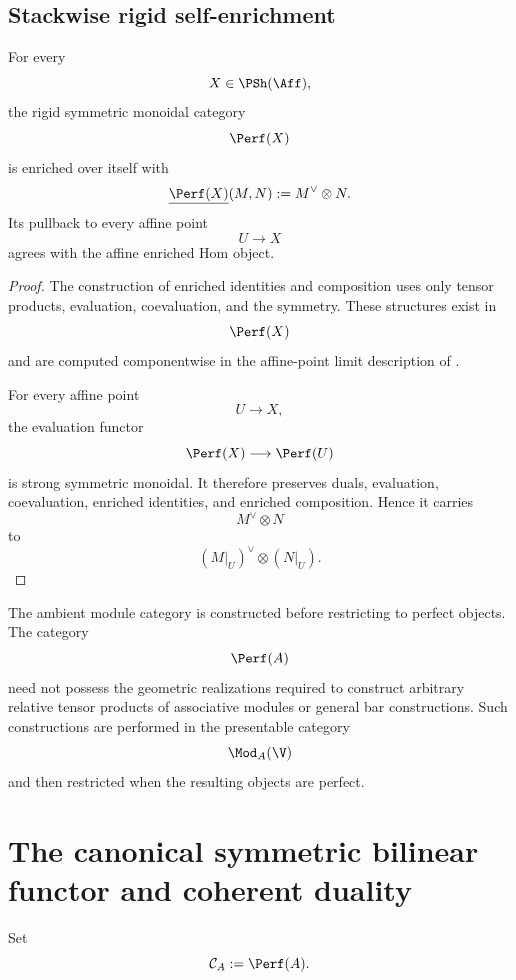 \subsection{Stackwise rigid self-enrichment}

\begin{proposition}
\label{prop:perfect-stack-self-enrichment}
For every
\[
    X\in\PSh(\Aff),
\]
the rigid symmetric monoidal category
\[
    \Perf(X)
\]
is enriched over itself with
\[
    \underline{\Perf(X)}(M,N)
    :=
    M^\vee\otimes N.
\]
Its pullback to every affine point
\[
    U
    \longrightarrow
    X
\]
agrees with the affine enriched Hom object.
\end{proposition}

\begin{proof}
The construction of enriched identities and composition uses only tensor
products, evaluation, coevaluation, and the symmetry. These structures
exist in
\[
    \Perf(X)
\]
and are computed componentwise in the affine-point limit description of
.

For every affine point
\[
    U
    \longrightarrow
    X,
\]
the evaluation functor
\[
    \Perf(X)
    \longrightarrow
    \Perf(U)
\]
is strong symmetric monoidal. It therefore preserves duals, evaluation,
coevaluation, enriched identities, and enriched composition. Hence it
carries
\[
    M^\vee\otimes N
\]
to
\[
    (M|_U)^\vee\otimes(N|_U).
\]
\end{proof}

\begin{remark}
\label{rem:perfect-restriction-after-construction}
The ambient module category is constructed before restricting to perfect
objects. The category
\[
    \Perf(A)
\]
need not possess the geometric realizations required to construct
arbitrary relative tensor products of associative modules or general bar
constructions. Such constructions are performed in the presentable
category
\[
    \Mod_A(\V)
\]
and then restricted when the resulting objects are perfect.
\end{remark}

\section{The canonical symmetric bilinear functor and coherent duality}
\label{sec:canonical-perfect-duality}

Set
\[
    \mathcal C_A
    :=
    \Perf(A).
\]



